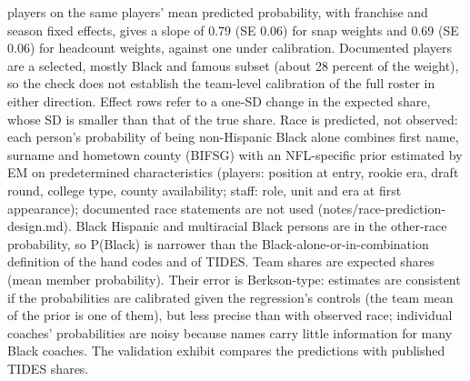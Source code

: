 {players on the same players' mean predicted probability, with franchise and season fixed effects, gives a slope of 0.79 (SE 0.06) for snap weights and  0.69 (SE 0.06) for headcount weights, against one under calibration. Documented players are a selected, mostly Black and famous subset (about 28 percent of the weight), so the check does not establish the team-level calibration of the full roster in either direction. Effect rows refer to a one-SD change in the expected share, whose SD is smaller than that of the true share. Race is predicted, not observed: each person's probability of being non-Hispanic Black alone combines first name, surname and hometown county (BIFSG) with an NFL-specific prior estimated by EM on predetermined characteristics (players: position at entry, rookie era, draft round, college type, county availability; staff: role, unit and era at first appearance); documented race statements are not used (notes/race-prediction-design.md). Black Hispanic and multiracial Black persons are in the other-race probability, so P(Black) is narrower than the Black-alone-or-in-combination definition of the hand codes and of TIDES. Team shares are expected shares (mean member probability). Their error is Berkson-type: estimates are consistent if the probabilities are calibrated given the regression's controls (the team mean of the prior is one of them), but less precise than with observed race; individual coaches' probabilities are noisy because names carry little information for many Black coaches. The validation exhibit compares the predictions with published TIDES shares.
\par}

